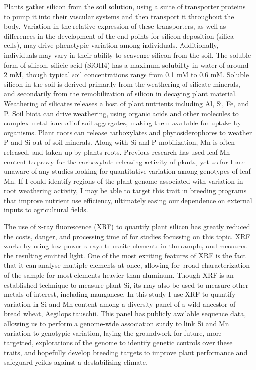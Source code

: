 \documentclass[12pt, letterpaper, ]{article}
\begin{document}
Plants gather silicon from the soil solution, using a suite of transporter proteins to pump it into their vascular systems and then transport it throughout the body.  Variation in the relative expression of these transporters, as well as differences in the development of the end points for silicon deposition (silica cells), may drive phenotypic variation among individuals. Additionally, individuals may vary in their ability to scavenge silicon from the soil. The soluble form of silicon, silicic acid (SiOH4) has a maximum solubility in water of around 2 mM, though typical soil concentrations range from 0.1 mM to 0.6 mM. Soluble silicon in the soil is derived primarily from the weathering of silicate minerals, and secondarily from the remobilization of silicon in decaying plant material. Weathering of silicates releases a host of plant nutrients including Al, Si, Fe, and P. Soil biota can drive weathering, using organic acids and other molecules to complex metal ions off of soil aggregates, making them available for uptake by organisms. Plant roots can release carboxylates and phytosiderophores to weather P and Si out of soil minerals. Along with Si and P mobilization, Mn is often released, and taken up by plants roots. Previous research has used leaf Mn content to proxy for the carboxylate releasing activity of plants, yet so far I are unaware of any studies looking for quantitative variation among genotypes of leaf Mn. If I could identify regions of the plant genome associated with variation in root weathering activity, I may be able to target this trait in breeding programs that improve nutrient use efficiency, ultimately easing our dependence on external inputs to agricultural fields. 

The use of x-ray fluorescence (XRF) to quantify plant silicon has greatly reduced the costs, danger, and processing time of for studies focussing on this topic. XRF works by using low-power x-rays to excite elements in the sample, and measures the resulting emitted light. One of the most exciting features of XRF is the fact that it can analyse multiple elements at once, allowing for broad characterization of the sample for most elements heavier than aluminum. Though XRF is an established technique to measure plant Si, its may also be used to measure other metals of interest, including manganese. In this study I use XRF to quantify variation in Si and Mn content among a diversity panel of a wild ancestor of bread wheat, Aegilops tauschii. This panel has publicly available sequence data, allowing us to perform a genome-wide association sutdy to link Si and Mn variation to genotypic variation, laying the groundwork for future, more targetted, explorations of the genome to identify genetic controls over these traits, and hopefully develop breeding targets to improve plant performance and safeguard yeilds against a destabilizing climate.
\end{document}
